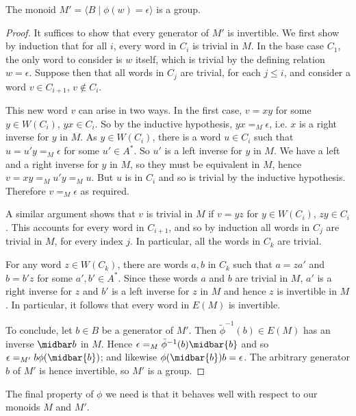 \documentclass[noindex,noinsetproof,12pt]{lmaths}
\begin{document}
\begin{prop} \label{prop:M'-is-group}
	The monoid $M' = \langle B \mid \phi(w) = \epsilon\rangle$ is a group.
\end{prop}
\begin{proof}
	It suffices to show that every generator of $M'$ is invertible. We first show by induction that for all $i$, every word in $C_i$ is trivial in $M$. In the base case $C_1$, the only word to consider is $w$ itself, which is trivial by the defining relation $w = \epsilon$. Suppose then that all words in $C_j$ are trivial, for each $j \le i$, and consider a word $v \in C_{i+1}$, $v \not\in C_i$.

	This new word $v$ can arise in two ways. In the first case, $v = xy$ for some $y \in W(C_i)$, $yx \in C_i$. So by the inductive hypothesis, $yx =_M \epsilon$, i.e. $x$ is a right inverse for $y$ in $M$. As $y \in W(C_i)$, there is a word $u \in C_i$ such that $u = u'y =_M \epsilon$ for some $u' \in A^*$. So $u'$ is a left inverse for $y$ in $M$. We have a left and a right inverse for $y$ in $M$, so they must be equivalent in $M$, hence $v = xy =_M u'y =_M u$. But $u$ is in $C_i$ and so is trivial by the inductive hypothesis. Therefore $v =_M \epsilon$ as required.

	A similar argument shows that $v$ is trivial in $M$ if $v = yz$ for $y \in W(C_i)$, $zy \in C_i$. This accounts for every word in $C_{i+1}$, and so by induction all words in $C_j$ are trivial in $M$, for every index $j$. In particular, all the words in $C_k$ are trivial.

	For any word $z \in W(C_k)$, there are words $a, b$ in $C_k$ such that $a = za'$ and $b = b'z$ for some $a', b' \in A^*$. Since these words $a$ and $b$ are trivial in $M$, $a'$ is a right inverse for $z$ and $b'$ is a left inverse for $z$ in $M$ and hence $z$ is invertible in $M$. In particular, it follows that every word in $E(M)$ is invertible.

	To conclude, let $b \in B$ be a generator of $M'$. Then $\tilde\phi^{-1}(b) \in E(M)$ has an inverse $\midbar b$ in $M$. Hence $\epsilon =_M \tilde\phi^{-1}(b) \midbar{b}$ and so $\epsilon =_{M'} b\phi(\midbar{b})$; and likewise $\phi(\midbar{b})b = \epsilon$. The arbitrary generator $b$ of $M'$ is hence invertible, so $M'$ is a group.
\end{proof}

The final property of $\phi$ we need is that it behaves well with respect to our monoids $M$ and $M'$.
\end{document}
